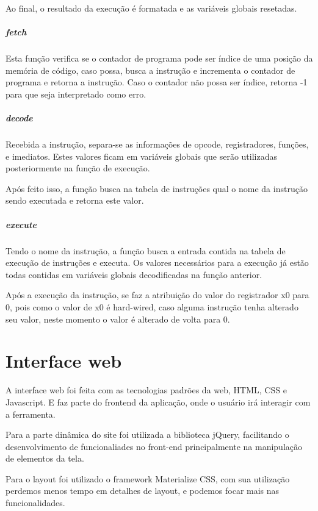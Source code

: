 					Ao final, o resultado da execução é formatada e as variáveis globais resetadas.

				\subparagraph{fetch}
				
					Esta função verifica se o contador de programa pode ser índice de uma posição da memória de código, caso possa, busca a instrução e incrementa o contador de programa e retorna a instrução. Caso o contador não possa ser índice, retorna -1 para que seja interpretado como erro.

				\subparagraph{decode}
					
					Recebida a instrução, separa-se as informações de opcode, registradores, funções, e imediatos. Estes valores ficam em variáveis globais que serão utilizadas posteriormente na função de execução.

					Após feito isso, a função busca na tabela de instruções qual o nome da instrução sendo executada e retorna este valor.


				\subparagraph{execute}
			
					Tendo o nome da instrução, a função busca a entrada contida na tabela de execução de instruções e executa. Os valores necessários para a execução já estão todas contidas em variáveis globais decodificadas na função anterior.

					Após a execução da instrução, se faz a atribuição do valor do registrador x0 para 0, pois como o valor de x0 é hard-wired, caso alguma instrução tenha alterado seu valor, neste momento o valor é alterado de volta para 0.



\section{Interface web}

	A interface web foi feita com as tecnologias padrões da web, HTML, CSS e Javascript. E faz parte do frontend da aplicação, onde o usuário irá interagir com a ferramenta. 

	Para a parte dinâmica do site foi utilizada a biblioteca jQuery, facilitando o desenvolvimento de funcionaliades no front-end principalmente na manipulação de elementos da tela. 

	Para o layout foi utilizado o framework Materialize CSS, com sua utilização perdemos menos tempo em detalhes de layout, e podemos focar mais nas funcionalidades.

